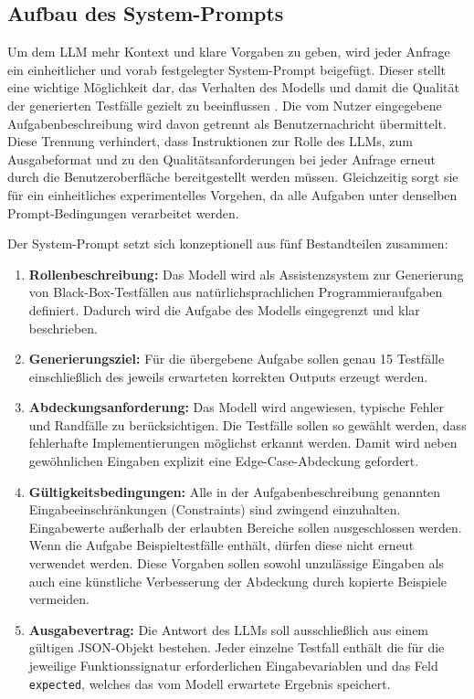 \subsection{Aufbau des System-Prompts}
Um dem \ac{LLM} mehr Kontext und klare Vorgaben zu geben, wird jeder Anfrage ein einheitlicher und vorab festgelegter System-Prompt beigefügt.
Dieser stellt eine wichtige Möglichkeit dar, das Verhalten des Modells und damit die Qualität der generierten Testfälle gezielt zu beeinflussen \cite{santana_software_2025}.
Die vom Nutzer eingegebene Aufgabenbeschreibung wird davon getrennt als Benutzernachricht
übermittelt. Diese Trennung verhindert, dass Instruktionen zur Rolle des \ac{LLM}s, zum
Ausgabeformat und zu den Qualitätsanforderungen bei jeder Anfrage erneut durch
die Benutzeroberfläche bereitgestellt werden müssen. Gleichzeitig sorgt sie
für ein einheitliches experimentelles Vorgehen, da alle Aufgaben unter
denselben Prompt-Bedingungen verarbeitet werden.

Der System-Prompt setzt sich konzeptionell aus fünf Bestandteilen zusammen:

\begin{enumerate}
    \item \textbf{Rollenbeschreibung:} Das Modell wird als Assistenzsystem zur
          Generierung von Black-Box-Testfällen aus natürlichsprachlichen
          Programmieraufgaben definiert. Dadurch wird die Aufgabe des Modells
          eingegrenzt und klar beschrieben.
    \item \textbf{Generierungsziel:} Für die übergebene Aufgabe sollen genau
          15 Testfälle einschließlich des jeweils erwarteten korrekten Outputs
          erzeugt werden.
    \item \textbf{Abdeckungsanforderung:} Das Modell wird angewiesen, typische
          Fehler und Randfälle zu berücksichtigen. Die Testfälle sollen so
          gewählt werden, dass fehlerhafte Implementierungen möglichst
          erkannt werden. Damit wird neben gewöhnlichen Eingaben explizit
          eine Edge-Case-Abdeckung gefordert.
    \item \textbf{Gültigkeitsbedingungen:} Alle in der Aufgabenbeschreibung
          genannten Eingabeeinschränkungen (Constraints) sind zwingend einzuhalten. Eingabewerte
          außerhalb der erlaubten Bereiche sollen ausgeschlossen werden. Wenn die Aufgabe 
          Beispieltestfälle enthält, dürfen diese nicht erneut verwendet werden.
          Diese Vorgaben sollen sowohl unzulässige Eingaben als auch
          eine künstliche Verbesserung der Abdeckung durch kopierte Beispiele
          vermeiden.
    \item \textbf{Ausgabevertrag:} Die Antwort des \ac{LLM}s soll ausschließlich aus einem
          gültigen \acs{JSON}-Objekt bestehen. Jeder einzelne Testfall enthält die für die
          jeweilige Funktionssignatur erforderlichen Eingabevariablen und das
          Feld \texttt{expected}, welches das vom Modell erwartete Ergebnis speichert.
\end{enumerate}

